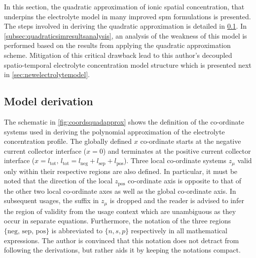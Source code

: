 
In   this    section,   the    quadratic   approximation   of    ionic   spatial
concentration,   that  underpins   the  electrolyte   model  in   many  improved
\gls{spm}  formulations  is  presented.  The  steps  involved  in  deriving  the
quadratic   approximation   is  detailed   in \cref{subsec:quadraticmodelderiv}.
In \cref{subsec:quadraticsimresultsanalysis},  an analysis  of  the weakness  of
this  model is  performed  based  on the  results  from  applying the  quadratic
approximation scheme. Mitigation of this critical drawback lead to this author's
decoupled  spatio-temporal electrolyte  concentration model  structure which  is
presented next in \cref{sec:newelectrolytemodel}.

\subsection{Model derivation}\label{subsec:quadraticmodelderiv}

The  schematic  in \cref{fig:coordsquadapprox}  shows   the  definition  of  the
co-ordinate  systems  used  in  deriving the  polynomial  approximation  of  the
electrolyte concentration  profile. The globally defined  $x$ co-ordinate starts
at  the negative  current  collector  interface ($x=0$)  and  terminates at  the
positive  current  collector  interface  ($x =  l_\text{tot},\,  l_\text{tot}  =
l_\text{neg} +  l_\text{sep} +  l_\text{pos}$). Three local  co-ordinate systems
$z_\mu$  valid  only  within  their  respective regions  are  also  defined.  In
particular, it  must be  noted that  the direction  of the  local $z_\text{pos}$
co-ordinate axis is opposite to that of  the other two local co-ordinate axes as
well as the global co-ordinate axis. In subsequent usages, the suffix in $z_\mu$
is dropped and  the reader is advised  to infer the region of  validity from the
usage  context  which are  unambiguous  as  they  occur in  separate  equations.
Furthermore, the  notation of  the three regions  $\{\text{neg, sep,  pos}\}$ is
abbreviated  to $\{n,s,p\}$  respectively in  all mathematical  expressions. The
author  is convinced  that this  notation does  not detract  from following  the
derivations, but rather aids it by keeping the notations compact.


